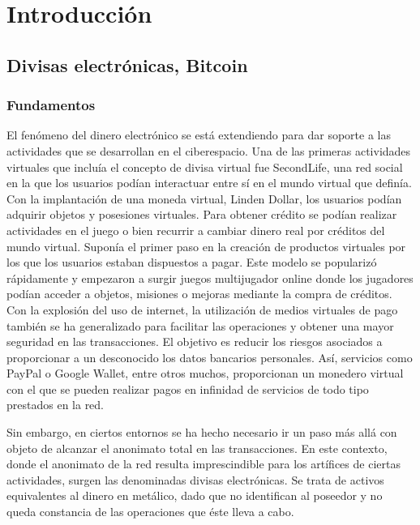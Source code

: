 \chapter{Introducci\'on}

\section{Divisas electr\'onicas, Bitcoin}

\subsection{Fundamentos}

El fen\'omeno del dinero electr\'onico se est\'a extendiendo para dar soporte a las actividades 
que se desarrollan en el ciberespacio. Una de las primeras actividades virtuales que inclu\'ia el 
concepto de divisa virtual fue SecondLife, una red social en la que los usuarios pod\'ian 
interactuar entre s\'i en el mundo virtual que defin\'ia. Con la implantaci\'on de una moneda 
virtual, Linden Dollar, los usuarios pod\'ian adquirir objetos y posesiones virtuales. Para 
obtener cr\'edito se pod\'ian realizar actividades en el juego o bien recurrir a cambiar dinero 
real por cr\'editos del mundo virtual. Supon\'ia el primer paso en la creaci\'on de productos 
virtuales por los que los usuarios estaban dispuestos a pagar. Este modelo se populariz\'o 
r\'apidamente y empezaron a surgir juegos multijugador online donde los jugadores pod\'ian 
acceder a objetos, misiones o mejoras mediante la compra de cr\'editos. 
\newline 
Con la explosi\'on del uso de internet, la utilizaci\'on de medios virtuales de pago tambi\'en se ha 
generalizado para facilitar las operaciones y obtener una mayor seguridad en las 
transacciones. El objetivo es reducir los riesgos asociados a proporcionar a un desconocido 
los datos bancarios personales. As\'i, servicios como PayPal o Google Wallet, entre otros 
muchos, proporcionan un monedero virtual con el que se pueden realizar pagos en infinidad 
de servicios de todo tipo prestados en la red. 
 
Sin embargo, en ciertos entornos se ha hecho necesario ir un paso m\'as all\'a con objeto de 
alcanzar el anonimato total en las transacciones. En este contexto, donde el anonimato de la 
red resulta imprescindible para los art\'ifices de ciertas actividades, surgen las denominadas 
divisas electr\'onicas. Se trata de activos equivalentes al dinero en met\'alico, dado que no 
identifican al poseedor y no queda constancia de las operaciones que \'este lleva a cabo.

